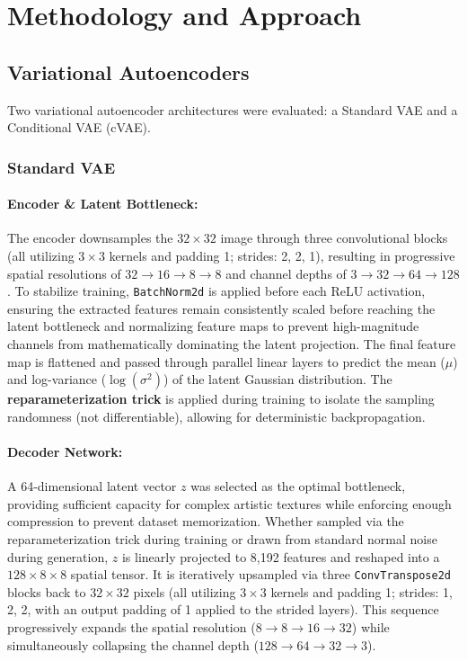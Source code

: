 \documentclass[runningheads]{llncs}
\begin{document}
\section{Methodology and Approach}
\subsection{Variational Autoencoders}
Two variational autoencoder architectures were evaluated: a Standard VAE and a Conditional VAE (cVAE).
\subsubsection{Standard VAE}

\paragraph{\normalfont\textbf{Encoder \& Latent Bottleneck:}}
The encoder downsamples the $32 \times 32$ image through three convolutional blocks (all utilizing $3 \times 3$ kernels and padding 1; strides: 2, 2, 1), resulting in progressive spatial resolutions of $32 \rightarrow 16 \rightarrow 8 \rightarrow 8$ and channel depths of $3 \rightarrow 32 \rightarrow 64 \rightarrow 128$. To stabilize training, \texttt{BatchNorm2d} is applied before each ReLU activation, ensuring the extracted features remain consistently scaled before
reaching the latent bottleneck and normalizing feature maps to prevent high-magnitude channels from mathematically dominating the latent projection.
The final feature map is flattened and passed through parallel linear layers to predict the mean ($\mu$) and log-variance ($\log(\sigma^2)$) of the latent Gaussian distribution. The \textbf{reparameterization trick} is applied during training to isolate the sampling randomness (not differentiable), allowing for deterministic backpropagation.


\paragraph{\normalfont\textbf{Decoder Network:}}
A 64-dimensional latent vector $z$ was selected as the optimal bottleneck, providing sufficient capacity for complex artistic textures while enforcing enough compression to prevent dataset memorization. Whether sampled via the reparameterization trick during training or drawn from standard normal noise during generation, $z$ is linearly projected to 8,192 features and reshaped into a $128 \times 8 \times 8$ spatial tensor. It is iteratively upsampled via three \texttt{ConvTranspose2d} blocks back to $32 \times 32$ pixels (all utilizing $3 \times 3$ kernels and padding 1; strides: 1, 2, 2, with an output padding of 1 applied to the strided layers). This sequence progressively expands the spatial resolution ($8 \rightarrow 8 \rightarrow 16 \rightarrow 32$) while simultaneously collapsing the channel depth ($128 \rightarrow 64 \rightarrow 32 \rightarrow 3$).
\end{document}
